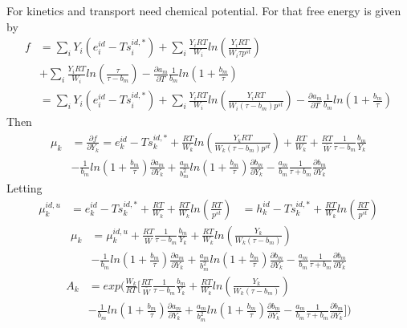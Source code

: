 \documentclass[11pt]{article}
\newcommand{\wbar}{\overline{W}}
\begin{document}
For kinetics and transport need chemical potential. For that free energy is given by
\begin{align}
f &= \sum_i Y_i (e_i^{id} - T s_i^{id,*}) +  \sum_i \frac{Y_i R T}{W_i} ln (\frac{Y_i R T}{W_i \tau p^{st}})  \nonumber \\
&+ \sum_i \frac{Y_i R T}{W_i} ln (\frac{\tau}{\tau-b_m}) - \frac{\partial a_m}{\partial T} \frac{1}{b_m}
ln (1+ \frac{b_m}{\tau})  \nonumber \\
 &= \sum_i Y_i (e_i^{id} - T s_i^{id,*}) +  \sum_i \frac{Y_i R T}{W_i} ln (\frac{Y_i R T}{W_i (\tau-b_m) p^{st}} )
- \frac{\partial a_m}{\partial T} \frac{1}{b_m}
ln (1+ \frac{b_m}{\tau})  \nonumber 
\end{align}
Then
\begin{align}
\mu_k &= \frac{\partial f}{\partial Y_k} = 
e_k^{id} - T s_k^{id,*}  + \frac{RT}{W_k} ln (\frac{Y_k R T}{W_k (\tau-b_m) p^{st}})
+ \frac{RT}{W_k} +  \frac{RT}{\wbar} \frac{1}{\tau-b_m} \frac {b_m}{Y_k} \nonumber \\
&- \frac{1}{b_m} ln(1 + \frac{b_m}{\tau}) \frac{\partial a_m}{\partial Y_k}
+ \frac{a_m}{b_m^2} ln(1 + \frac{b_m}{\tau}) \frac{\partial b_m}{\partial Y_k}
- \frac{a_m}{b_m} \frac{1}{\tau+b_m} \frac{\partial b_m}{\partial Y_k}
\end{align}
Letting
\begin{align}
\mu_k^{id,u} &=  e_k^{id} - T s_k^{id,*} + \frac{RT}{W_k}+ \frac{R T}{W_k} ln( \frac{RT}{p^{st}})
 &=  h_k^{id} - T s_k^{id,*} + \frac{R T}{W_k} ln( \frac{RT}{p^{st}})
\end{align}
\begin{align}
\mu_k &= \mu_k^{id,u} + \frac{RT}{\wbar} \frac{1}{\tau-b_m} \frac {b_m}{Y_k}
+ \frac {RT}{W_k} ln ( \frac{Y_k}{W_k (\tau-b_m)}) \nonumber \\
&- \frac{1}{b_m} ln(1 + \frac{b_m}{\tau}) \frac{\partial a_m}{\partial Y_k}
+ \frac{a_m}{b_m^2} ln(1 + \frac{b_m}{\tau}) \frac{\partial b_m}{\partial Y_k}
- \frac{a_m}{b_m} \frac{1}{\tau+b_m} \frac{\partial b_m}{\partial Y_k}
\end{align}
\begin{align}
A_k &=  exp  (  \frac{W_k}{RT}   [
\frac{RT}{\wbar} \frac{1}{\tau-b_m} \frac {b_m}{Y_k}
+ \frac {RT}{W_k} ln ( \frac{Y_k}{W_k (\tau-b_m)}) \nonumber \\
&- \frac{1}{b_m} ln(1 + \frac{b_m}{\tau}) \frac{\partial a_m}{\partial Y_k}
+ \frac{a_m}{b_m^2} ln(1 + \frac{b_m}{\tau}) \frac{\partial b_m}{\partial Y_k}
- \frac{a_m}{b_m} \frac{1}{\tau+b_m} \frac{\partial b_m}{\partial Y_k} ] )
\end{align}
\end{document}
